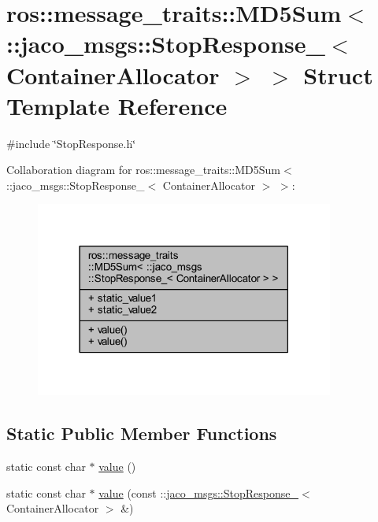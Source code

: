 \hypertarget{structros_1_1message__traits_1_1MD5Sum_3_01_1_1jaco__msgs_1_1StopResponse___3_01ContainerAllocator_01_4_01_4}{}\section{ros\+:\+:message\+\_\+traits\+:\+:M\+D5\+Sum$<$ \+:\+:jaco\+\_\+msgs\+:\+:Stop\+Response\+\_\+$<$ Container\+Allocator $>$ $>$ Struct Template Reference}
\label{structros_1_1message__traits_1_1MD5Sum_3_01_1_1jaco__msgs_1_1StopResponse___3_01ContainerAllocator_01_4_01_4}


{\ttfamily \#include \char`\"{}Stop\+Response.\+h\char`\"{}}



Collaboration diagram for ros\+:\+:message\+\_\+traits\+:\+:M\+D5\+Sum$<$ \+:\+:jaco\+\_\+msgs\+:\+:Stop\+Response\+\_\+$<$ Container\+Allocator $>$ $>$\+:
\nopagebreak
\begin{figure}[H]
\begin{center}
\leavevmode
\includegraphics[width=278pt]{dd/d63/structros_1_1message__traits_1_1MD5Sum_3_01_1_1jaco__msgs_1_1StopResponse___3_01ContainerAllocator_01_4_01_4__coll__graph}
\end{center}
\end{figure}
\subsection*{Static Public Member Functions}
\begin{DoxyCompactItemize}
\item 
static const char $\ast$ \hyperlink{structros_1_1message__traits_1_1MD5Sum_3_01_1_1jaco__msgs_1_1StopResponse___3_01ContainerAllocator_01_4_01_4_aff645184aa7379e78621fb45aa8eff2d}{value} ()
\item 
static const char $\ast$ \hyperlink{structros_1_1message__traits_1_1MD5Sum_3_01_1_1jaco__msgs_1_1StopResponse___3_01ContainerAllocator_01_4_01_4_a6c415c37642d272cc6acc563479ee0f6}{value} (const \+::\hyperlink{structjaco__msgs_1_1StopResponse__}{jaco\+\_\+msgs\+::\+Stop\+Response\+\_\+}$<$ Container\+Allocator $>$ \&)
\end{DoxyCompactItemize}
